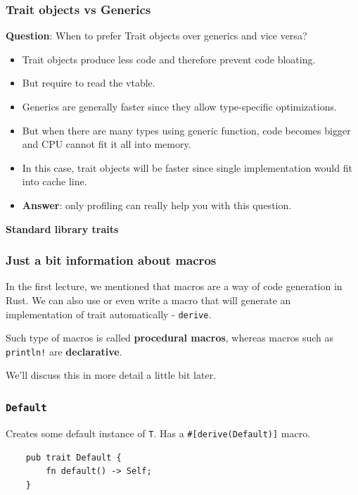 \documentclass[aspectratio=1610,t]{beamer}
\begin{document}

\begin{frame}[fragile]
\frametitle{Trait objects vs Generics}
\textbf{Question}: When to prefer Trait objects over generics and vice versa?

\begin{itemize}
    \item<2-> Trait objects produce less code and therefore prevent code bloating.
    \item<3-> But require to read the vtable.
    \item<4-> Generics are generally faster since they allow type-specific optimizations.
    \item<5-> But when there are many types using generic function, code becomes bigger and CPU cannot fit it all into memory.
    \item<6-> In this case, trait objects will be faster since single implementation would fit into cache line.
    \item<7-> \textbf{Answer}: only profiling can really help you with this question. 
\end{itemize}
\end{frame}


\begin{frame}[c]
\centering\Huge\textbf{Standard library traits}
\end{frame}


\begin{frame}[fragile]
\frametitle{Just a bit information about macros}
In the first lecture, we mentioned that macros are a way of code generation in Rust. We can also use or even write a macro that will generate an implementation of trait automatically - \texttt{derive}.

Such type of macros is called \textbf{procedural macros}, whereas macros such as \texttt{println!} are \textbf{declarative}.

We'll discuss this in more detail a little bit later.
\end{frame}


\begin{frame}[fragile]
\frametitle{\texttt{Default}}
Creates some default instance of \texttt{T}. Has a \texttt{\#[derive(Default)]} macro.

\begin{verbatim}
    pub trait Default {
        fn default() -> Self;
    }
\end{verbatim}
\end{frame}
\end{document}
